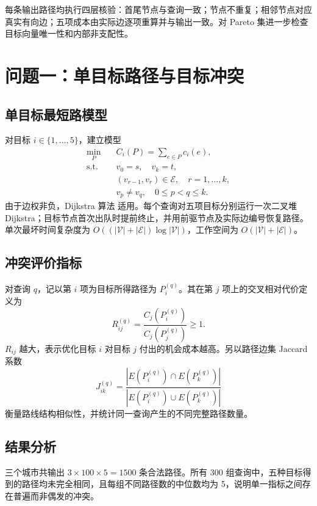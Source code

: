 \documentclass[UTF8,a4paper]{ctexart}
\newcommand{\E}{\mathcal{E}}
\newcommand{\V}{\mathcal{V}}
\begin{document}
每条输出路径均执行四层核验：首尾节点与查询一致；节点不重复；相邻节点对应真实有向边；五项成本由实际边逐项重算并与输出一致。对 Pareto 集进一步检查目标向量唯一性和内部非支配性。

\section{问题一：单目标路径与目标冲突}

\subsection{单目标最短路模型}

对目标 $i\in\{1,\ldots,5\}$，建立模型
\begin{align}
\min_{P}\quad & C_i(P)=\sum_{e\in P}c_i(e),\\
\text{s.t.}\quad & v_0=s,\quad v_k=t,\\
& (v_{r-1},v_r)\in\E,\quad r=1,\ldots,k,\\
& v_p\neq v_q,\quad 0\le p<q\le k.
\end{align}
由于边权非负，Dijkstra 算法\cite{dijkstra} 适用。每个查询对五项目标分别运行一次二叉堆 Dijkstra；目标节点首次出队时提前终止，并用前驱节点及实际边编号恢复路径。单次最坏时间复杂度为 $O((|\V|+|\E|)\log|\V|)$，工作空间为 $O(|\V|+|\E|)$。

\subsection{冲突评价指标}

对查询 $q$，记以第 $i$ 项为目标所得路径为 $P_i^{(q)}$。其在第 $j$ 项上的交叉相对代价定义为
\begin{equation}
R_{ij}^{(q)}=\frac{C_j(P_i^{(q)})}{C_j(P_j^{(q)})}\ge 1.
\end{equation}
$R_{ij}$ 越大，表示优化目标 $i$ 对目标 $j$ 付出的机会成本越高。另以路径边集 Jaccard 系数
\begin{equation}
J_{ik}^{(q)}=\frac{|E(P_i^{(q)})\cap E(P_k^{(q)})|}
{|E(P_i^{(q)})\cup E(P_k^{(q)})|}
\end{equation}
衡量路线结构相似性，并统计同一查询产生的不同完整路径数量。

\subsection{结果分析}

三个城市共输出 $3\times100\times5=1500$ 条合法路径。所有 300 组查询中，五种目标得到的路径均未完全相同，且每组不同路径数的中位数均为 5，说明单一指标之间存在普遍而非偶发的冲突。
\end{document}
